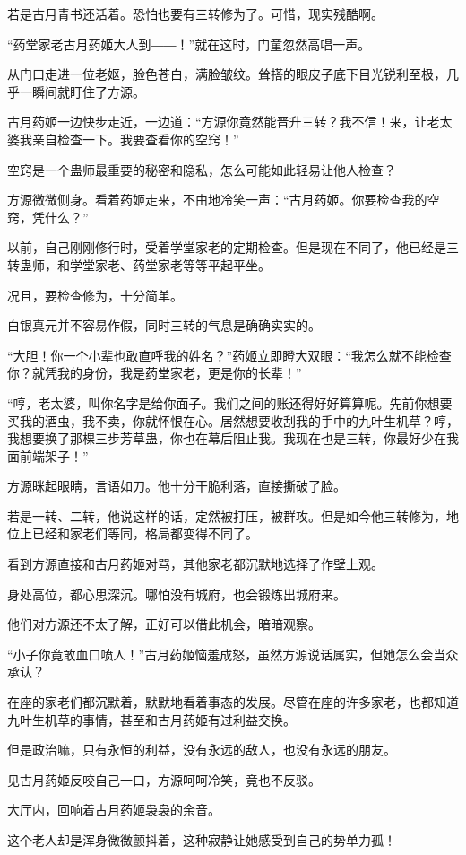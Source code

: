 \begin{this_body}
若是古月青书还活着。恐怕也要有三转修为了。可惜，现实残酷啊。

“药堂家老古月药姬大人到――！”就在这时，门童忽然高唱一声。

从门口走进一位老妪，脸色苍白，满脸皱纹。耸搭的眼皮子底下目光锐利至极，几乎一瞬间就盯住了方源。

古月药姬一边快步走近，一边道：“方源你竟然能晋升三转？我不信！来，让老太婆我亲自检查一下。我要查看你的空窍！”

空窍是一个蛊师最重要的秘密和隐私，怎么可能如此轻易让他人检查？

方源微微侧身。看着药姬走来，不由地冷笑一声：“古月药姬。你要检查我的空窍，凭什么？”

以前，自己刚刚修行时，受着学堂家老的定期检查。但是现在不同了，他已经是三转蛊师，和学堂家老、药堂家老等等平起平坐。

况且，要检查修为，十分简单。

白银真元并不容易作假，同时三转的气息是确确实实的。

“大胆！你一个小辈也敢直呼我的姓名？”药姬立即瞪大双眼：“我怎么就不能检查你？就凭我的身份，我是药堂家老，更是你的长辈！”

“哼，老太婆，叫你名字是给你面子。我们之间的账还得好好算算呢。先前你想要买我的酒虫，我不卖，你就怀恨在心。居然想要收刮我的手中的九叶生机草？哼，我想要换了那棵三步芳草蛊，你也在幕后阻止我。我现在也是三转，你最好少在我面前端架子！”

方源眯起眼睛，言语如刀。他十分干脆利落，直接撕破了脸。

若是一转、二转，他说这样的话，定然被打压，被群攻。但是如今他三转修为，地位上已经和家老们等同，格局都变得不同了。

看到方源直接和古月药姬对骂，其他家老都沉默地选择了作壁上观。

身处高位，都心思深沉。哪怕没有城府，也会锻炼出城府来。

他们对方源还不太了解，正好可以借此机会，暗暗观察。

“小子你竟敢血口喷人！”古月药姬恼羞成怒，虽然方源说话属实，但她怎么会当众承认？

在座的家老们都沉默着，默默地看着事态的发展。尽管在座的许多家老，也都知道九叶生机草的事情，甚至和古月药姬有过利益交换。

但是政治嘛，只有永恒的利益，没有永远的敌人，也没有永远的朋友。

见古月药姬反咬自己一口，方源呵呵冷笑，竟也不反驳。

大厅内，回响着古月药姬袅袅的余音。

这个老人却是浑身微微颤抖着，这种寂静让她感受到自己的势单力孤！


\end{this_body}
